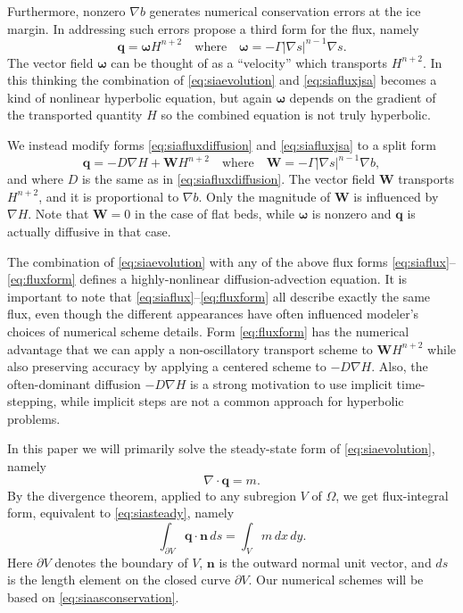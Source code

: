 \documentclass[twocolumn,letterpaper]{igs}
\newcommand\bn{\mathbf{n}}
\newcommand\bq{\mathbf{q}}
\newcommand\bW{\mathbf{W}}
\newcommand{\Div}{\nabla\cdot}
\newcommand{\grad}{\nabla}
\begin{document}
Furthermore, nonzero $\grad b$ generates numerical conservation errors at the ice margin.  In addressing such errors \cite{JaroschSchoofAnslow2013} propose a third form for the flux, namely
\begin{equation}
   \bq = \boldsymbol{\omega} H^{n+2} \quad \text{where} \quad \boldsymbol{\omega} = - \Gamma |\grad s|^{n-1} \grad s. \label{eq:siafluxjsa}
\end{equation}
The vector field $\boldsymbol{\omega}$ can be thought of as a ``velocity'' which transports $H^{n+2}$.  In this thinking the combination of \eqref{eq:siaevolution} and \eqref{eq:siafluxjsa} becomes a kind of nonlinear hyperbolic equation, but again $\boldsymbol{\omega}$ depends on the gradient of the transported quantity $H$ so the combined equation is not truly hyperbolic.

We instead modify forms \eqref{eq:siafluxdiffusion} and \eqref{eq:siafluxjsa} to a split form
\begin{equation}
\bq = - D \grad H + \bW H^{n+2} \quad \text{where} \quad \bW = - \Gamma |\grad s|^{n-1} \grad b, \label{eq:fluxform}
\end{equation}
and where $D$ is the same as in \eqref{eq:siafluxdiffusion}.  The vector field $\bW$ transports $H^{n+2}$, and it is proportional to $\grad b$.  Only the magnitude of $\bW$ is influenced by $\grad H$.  Note that $\bW=0$ in the case of flat beds, while $\boldsymbol{\omega}$ is nonzero and $\bq$ is actually diffusive in that case.

The combination of \eqref{eq:siaevolution} with any of the above flux forms \eqref{eq:siaflux}--\eqref{eq:fluxform} defines a highly-nonlinear diffusion-advection equation.  It is important to note that \eqref{eq:siaflux}--\eqref{eq:fluxform} all describe exactly the same flux, even though the different appearances have often influenced modeler's choices of numerical scheme details.  Form \eqref{eq:fluxform} has the numerical advantage that we can apply a non-oscillatory transport scheme to $\bW H^{n+2}$ while also preserving accuracy by applying a centered scheme to $-D \grad H$.  Also, the often-dominant diffusion $-D \grad H$ is a strong motivation to use implicit time-stepping, while implicit steps are not a common approach for hyperbolic problems.

In this paper we will primarily solve the steady-state form of \eqref{eq:siaevolution}, namely
\begin{equation}
\Div \bq = m.  \label{eq:siasteady}
\end{equation}
By the divergence theorem, applied to any subregion $V$ of $\Omega$, we get flux-integral form, equivalent to \eqref{eq:siasteady}, namely
\begin{equation}
  \int_{\partial V} \bq \cdot \bn\,ds = \int_V m\, dx\,dy. \label{eq:siaasconservation}
\end{equation}
Here $\partial V$ denotes the boundary of $V$, $\bn$ is the outward normal unit vector, and $ds$ is the length element on the closed curve $\partial V$.  Our numerical schemes will be based on \eqref{eq:siaasconservation}.
\end{document}

